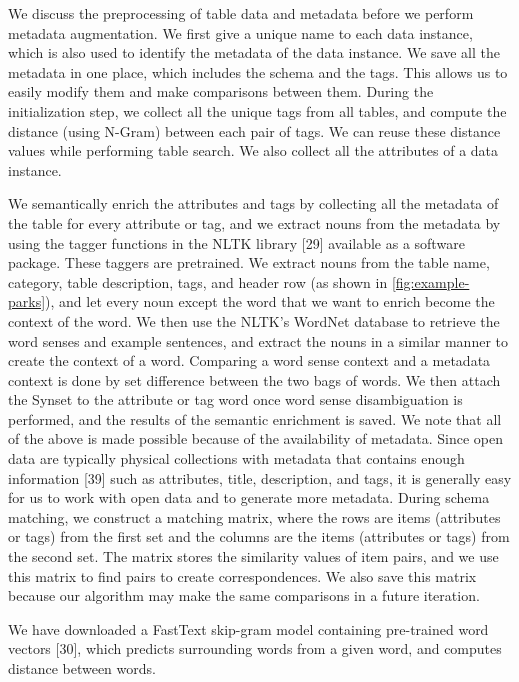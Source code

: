 We discuss the preprocessing of table data and metadata before we perform metadata augmentation. We first give a unique name to each data instance, which is also used to identify the metadata of the data instance. We save all the metadata in one place, which includes the schema and the tags. This allows us to easily modify them and make comparisons between them. During the initialization step, we collect all the unique tags from all tables, and compute the distance (using N-Gram) between each pair of tags. We can reuse these distance values while performing table search. We also collect all the attributes of a data instance.

We semantically enrich the attributes and tags by collecting all the metadata of the table for every attribute or tag, and we extract nouns from the metadata by using the tagger functions in the NLTK library \cite{loper-bird-2002-nltk}[29] available as a software package. These taggers are pretrained. We extract nouns from the table name, category, table description, tags, and header row (as shown in \autoref{fig:example-parks}), and let every noun except the word that we want to enrich become the context of the word. We then use the NLTK's WordNet database to retrieve the word senses and example sentences, and extract the nouns in a similar manner to create the context of a word. Comparing a word sense context and a metadata context is done by set difference between the two bags of words. We then attach the Synset to the attribute or tag word once word sense disambiguation is performed, and the results of the semantic enrichment is saved.
We note that all of the above is made possible because of the availability of metadata. Since open data are typically physical collections with metadata that contains enough information \cite{Rahm2016Case}[39] such as attributes, title, description, and tags, it is generally easy for us to work with open data and to generate more metadata.
During schema matching, we construct a matching matrix, where the rows are items (attributes or tags) from the first set and the columns are the items (attributes or tags) from the second set. The matrix stores the similarity values of item pairs, and we use this matrix to find pairs to create correspondences. We also save this matrix because our algorithm may make the same comparisons in a future iteration.

We have downloaded a FastText skip-gram model containing pre-trained word vectors \cite{mikolov-etal-2018-advances}[30], which predicts surrounding words from a given word, and computes distance between words.

